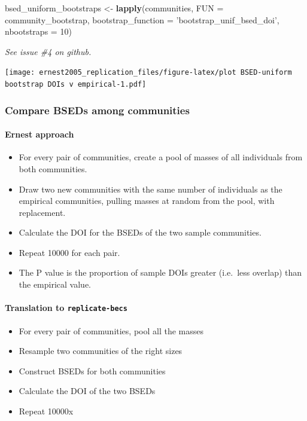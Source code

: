 \documentclass[]{article}
\newenvironment{Shaded}{\begin{snugshade}}{\end{snugshade}}
\newcommand{\KeywordTok}[1]{\textcolor[rgb]{0.13,0.29,0.53}{\textbf{#1}}}
\newcommand{\DataTypeTok}[1]{\textcolor[rgb]{0.13,0.29,0.53}{#1}}
\newcommand{\DecValTok}[1]{\textcolor[rgb]{0.00,0.00,0.81}{#1}}
\newcommand{\StringTok}[1]{\textcolor[rgb]{0.31,0.60,0.02}{#1}}
\newcommand{\NormalTok}[1]{#1}
\providecommand{\tightlist}{%
  \setlength{\itemsep}{0pt}\setlength{\parskip}{0pt}}
\let\oldparagraph\paragraph
\renewcommand{\paragraph}[1]{\oldparagraph{#1}\mbox{}}
\begin{document}
\begin{Shaded}
\begin{Highlighting}[]
\NormalTok{bsed_uniform_bootstraps <-}\StringTok{ }\KeywordTok{lapply}\NormalTok{(communities, }\DataTypeTok{FUN =}\NormalTok{ community_bootstrap,  }\DataTypeTok{bootstrap_function =} \StringTok{'bootstrap_unif_bsed_doi'}\NormalTok{, }\DataTypeTok{nbootstraps =} \DecValTok{10}\NormalTok{)}
\end{Highlighting}
\end{Shaded}

\emph{See issue \#4 on github.}

\texttt{[image: ernest2005\_replication\_files/figure-latex/plot BSED-uniform bootstrap DOIs v empirical-1.pdf]}

\subsubsection{Compare BSEDs among
communities}\label{compare-bseds-among-communities}

\paragraph{Ernest approach}\label{ernest-approach-1}

\begin{itemize}
\tightlist
\item
  For every pair of communities, create a pool of masses of all
  individuals from both communities.
\item
  Draw two new communities with the same number of individuals as the
  empirical communities, pulling masses at random from the pool, with
  replacement.
\item
  Calculate the DOI for the BSEDs of the two sample communities.
\item
  Repeat 10000 for each pair.
\item
  The P value is the proportion of sample DOIs greater (i.e.~less
  overlap) than the empirical value.
\end{itemize}

\paragraph{\texorpdfstring{Translation to
\texttt{replicate-becs}}{Translation to replicate-becs}}\label{translation-to-replicate-becs-5}

\begin{itemize}
\tightlist
\item
  For every pair of communities, pool all the masses
\item
  Resample two communities of the right sizes
\item
  Construct BSEDs for both communities
\item
  Calculate the DOI of the two BSEDs
\item
  Repeat 10000x
\end{itemize}
\end{document}
